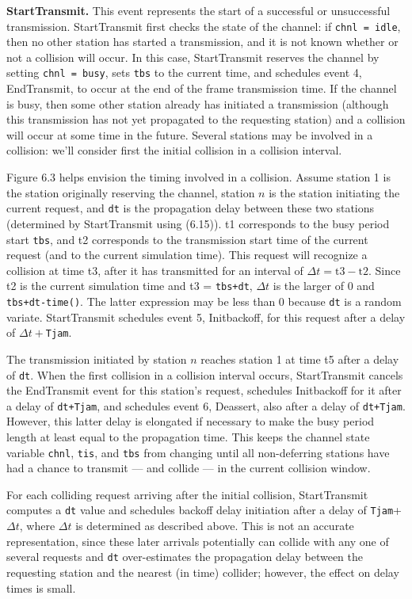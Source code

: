 \noindent\textbf{StartTransmit.} This event represents the start of a successful or unsuccessful transmission. StartTransmit first checks the state of the channel: if \texttt{chnl = idle}, then no other station has started a transmission, and it is not known whether or not a collision will occur. In this case, StartTransmit reserves the channel by setting \texttt{chnl = busy}, sets \texttt{tbs} to the current time, and schedules event 4, EndTransmit, to occur at the end of the frame transmission time. If the channel is busy, then some other station already has initiated a transmission (although this transmission has not yet propagated to the requesting station) and a collision will occur at some time in the future. Several stations may be involved in a collision: we'll consider first the initial collision in a collision interval.

Figure 6.3 helps envision the timing involved in a collision. Assume station 1 is the station originally reserving the channel, station $n$ is the station initiating the current request, and \texttt{dt} is the propagation delay between these two stations (determined by StartTransmit using (6.15)). t1 corresponds to the busy period start \texttt{tbs}, and t2 corresponds to the transmission start time of the current request (and to the current simulation time). This request will recognize a collision at time t3, after it has transmitted for an interval of $\Delta t=\text{t3}-\text{t2}$. Since t2 is the current simulation time and t3 = \texttt{tbs+dt}, $\Delta t$ is the larger of 0 and \texttt{tbs+dt-time()}. The latter expression may be less than 0 because \texttt{dt} is a random variate. StartTransmit schedules event 5, Initbackoff, for this request after a delay of $\Delta t+$\texttt{Tjam}.

The transmission initiated by station $n$ reaches station 1 at time t5 after a delay of \texttt{dt}. When the first collision in a collision interval occurs, StartTransmit cancels the EndTransmit event for this station's request, schedules Initbackoff for it after a delay of \texttt{dt+Tjam}, and schedules event 6, Deassert, also after a delay of \texttt{dt+Tjam}. However, this latter delay is elongated if necessary to make the busy period length at least equal to the propagation time. This keeps the channel state variable \texttt{chnl}, \texttt{tis}, and \texttt{tbs} from changing until all non-deferring stations have had a chance to transmit --- and collide --- in the current collision window.

For each colliding request arriving after the initial collision, StartTransmit computes a \texttt{dt} value and schedules backoff delay initiation after a delay of \texttt{Tjam}+$\Delta t$, where $\Delta t$ is determined as described above. This is not an accurate representation, since these later arrivals potentially can collide with any one of several requests and \texttt{dt} over-estimates the propagation delay between the requesting station and the nearest (in time) collider; however, the effect on delay times is small.

